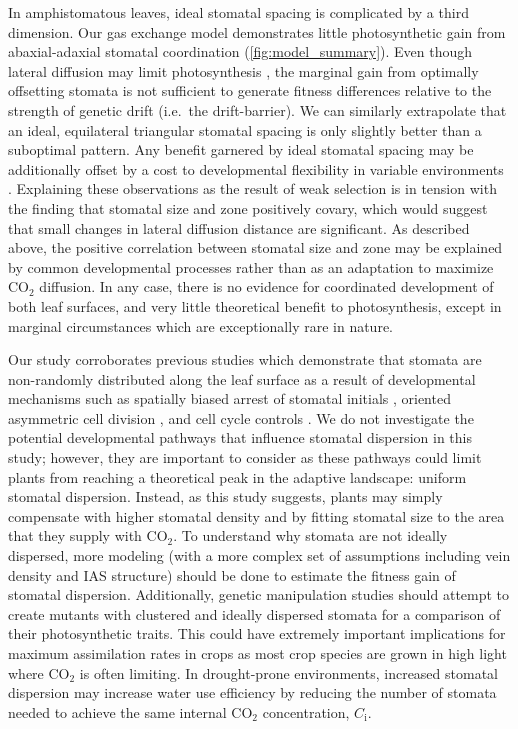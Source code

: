 \documentclass[webpdf,large,modern,unnumsec,namedate]{oup-authoring-template}
\begin{document}
In amphistomatous leaves, ideal stomatal spacing is complicated by a
third dimension. Our gas exchange model demonstrates little
photosynthetic gain from abaxial-adaxial stomatal coordination
(\autoref{fig:model_summary}). Even though lateral diffusion may limit
photosynthesis \citep{morison_lateral_2005}, the marginal gain from
optimally offsetting stomata is not sufficient to generate fitness
differences relative to the strength of genetic drift (i.e.~the
drift-barrier). We can similarly extrapolate that an ideal, equilateral
triangular stomatal spacing is only slightly better than a suboptimal
pattern. Any benefit garnered by ideal stomatal spacing may be
additionally offset by a cost to developmental flexibility in variable
environments
\citep{pillitteri_mechanisms_2012, baillie_developmental_2020}.
Explaining these observations as the result of weak selection is in
tension with the finding that stomatal size and zone positively covary,
which would suggest that small changes in lateral diffusion distance are
significant. As described above, the positive correlation between
stomatal size and zone may be explained by common developmental
processes rather than as an adaptation to maximize CO\(_2\) diffusion.
In any case, there is no evidence for coordinated development of both
leaf surfaces, and very little theoretical benefit to photosynthesis,
except in marginal circumstances which are exceptionally rare in nature.

Our study corroborates previous studies which demonstrate that stomata
are non-randomly distributed along the leaf surface as a result of
developmental mechanisms such as spatially biased arrest of stomatal
initials \citep{boetsch_arrest_1995}, oriented asymmetric cell division
\citep{geisler_oriented_2000}, and cell cycle controls
\citep{croxdale_stomatal_2000}. We do not investigate the potential
developmental pathways that influence stomatal dispersion in this study;
however, they are important to consider as these pathways could limit
plants from reaching a theoretical peak in the adaptive landscape:
uniform stomatal dispersion. Instead, as this study suggests, plants may
simply compensate with higher stomatal density and by fitting stomatal
size to the area that they supply with CO\(_2\). To understand why
stomata are not ideally dispersed, more modeling (with a more complex
set of assumptions including vein density and IAS structure) should be
done to estimate the fitness gain of stomatal dispersion. Additionally,
genetic manipulation studies should attempt to create mutants with
clustered and ideally dispersed stomata for a comparison of their
photosynthetic traits. This could have extremely important implications
for maximum assimilation rates in crops as most crop species are grown
in high light where CO\(_2\) is often limiting. In drought-prone
environments, increased stomatal dispersion may increase water use
efficiency by reducing the number of stomata needed to achieve the same
internal CO\(_2\) concentration, \(C_\text{i}\).
\end{document}
